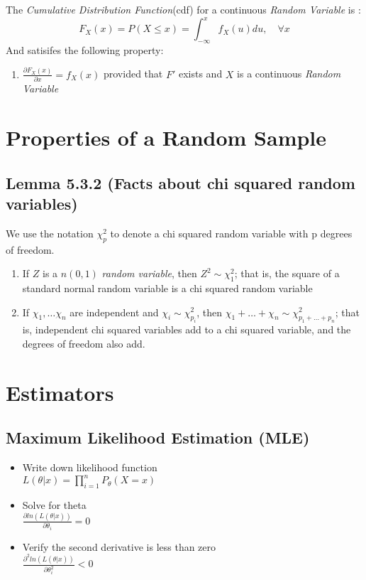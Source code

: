 \documentclass[12pt]{article}
\begin{document}
The \emph{Cumulative Distribution Function}(cdf) for a continuous \emph{Random Variable} is \cite[p.5]{classnotes.4}:
$$F_X(x)=P(X \leq x) = \int_{-\infty}^{x}f_X(u)du, \quad \forall x$$
And satisifes the following property:
\begin{enumerate}
\item $\frac{\partial F_X(x)}{\partial x}=f_X(x)$ provided that $F'$ exists and $X$ is a continuous \emph{Random Variable}
\end{enumerate}

\section*{Properties of a Random Sample}
\subsection*{Lemma 5.3.2 (Facts about chi squared random variables)\cite[p. 219]{StatisticalInference}}
We use the notation $\chi_p^2$ to denote a chi squared random variable with p degrees of freedom. 
\begin{enumerate}
\item If $Z$ is a $n(0, 1)$ \emph{random variable}, then $Z^2\sim\chi_1^2$; that is, the square of a standard normal random variable is a chi squared random variable
\item If $\chi_1,\dots\chi_n$ are independent and $\chi_i\sim\chi_{p_i}^2$, then $\chi_1+\dots+\chi_n\sim\chi_{p_1+\dots+p_n}^2$; that is, independent chi squared variables add to a chi squared variable, and the degrees of freedom also add.
\end{enumerate}

\section*{Estimators}

\subsection*{Maximum Likelihood Estimation (MLE)}
\begin{itemize}
\item Write down likelihood function \\ $L(\theta|x)=\prod\limits_{i=1}^{n}P_{\theta}(X=x)$
\item Solve for theta\\ $\frac{\partial ln(L(\theta|x))}{\partial \theta_i}=0$
\item Verify the second derivative is less than zero\\ $\frac{\partial^2 ln(L(\theta|x))}{\partial \theta_i^2}<0$
\end{itemize}
\end{document}
